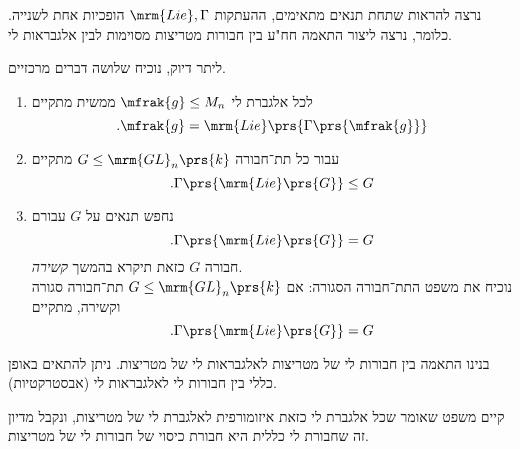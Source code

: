 \documentclass[10pt, twoside]{book}
\begin{document}
נרצה להראות שתחת תנאים מתאימים, ההעתקות
$\mrm{Lie}, \Gamma$
הופכיות אחת לשנייה.
כלומר,
נרצה ליצור התאמה חח"ע בין חבורות מטריצות מסוימות לבין אלגבראות לי.

ליתר דיוק, נוכיח שלושה דברים מרכזיים.

\begin{enumerate}
\item לכל אלגברת לי
$\mfrak{g} \leq M_n$
ממשית מתקיים
\[\text{.} \mfrak{g} = \mrm{Lie}\prs{\Gamma\prs{\mfrak{g}}}\]
\item עבור כל תת־חבורה
$G \leq \mrm{GL}_n\prs{k}$
מתקיים
\[\text{.} \Gamma\prs{\mrm{Lie}\prs{G}} \leq G\]
\item נחפש תנאים על
$G$
עבורם
\[\text{.} \Gamma\prs{\mrm{Lie}\prs{G}} = G\]
חבורה
$G$
כזאת תיקרא בהמשך
\emph{קשירה}.
\\
נוכיח את משפט התת־חבורה הסגורה:
אם
$G \leq \mrm{GL}_n\prs{k}$
תת־חבורה סגורה וקשירה, מתקיים
\[\text{.} \Gamma\prs{\mrm{Lie}\prs{G}} = G\]
\end{enumerate}

\begin{remark}
בנינו התאמה בין חבורות לי של מטריצות לאלגבראות לי של מטריצות.
ניתן להתאים באופן כללי בין חבורות לי לאלגבראות לי (אבסטרקטיות).

קיים משפט שאומר שכל אלגברת לי כזאת איזומורפית לאלגברת לי של מטריצות, ונקבל מדיון זה שחבורת לי כללית היא חבורת כיסוי של חבורות לי של מטריצות.
\end{remark}
\end{document}
